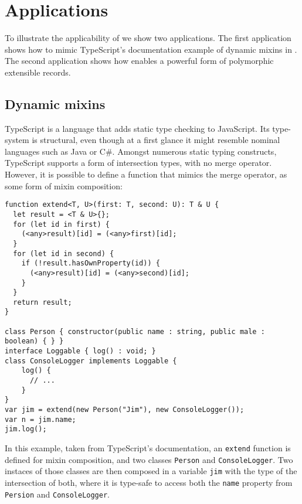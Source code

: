 \section{Applications}
\label{subsec:records}

To illustrate the applicability of \name we show two applications. The
first application shows how to mimic TypeScript's documentation example of 
dynamic mixins in \name. The second application shows how \name
enables a powerful form of polymorphic extensible records.

\subsection{Dynamic mixins}
TypeScript is a language that adds static type checking to JavaScript.
Its type-system is structural, even though at a first glance it might resemble 
nominal languages such as Java or C\#.
Amongst numerous static typing constructs, TypeScript supports a form of intersection types, 
with no merge operator. 
However, it is possible to define a function 
that mimics the merge operator, as some form of mixin composition:

\begin{lstlisting}
function extend<T, U>(first: T, second: U): T & U {
  let result = <T & U>{};
  for (let id in first) {
    (<any>result)[id] = (<any>first)[id];
  }
  for (let id in second) {
    if (!result.hasOwnProperty(id)) {
      (<any>result)[id] = (<any>second)[id];
    }
  }
  return result;
}

class Person { constructor(public name : string, public male : boolean) { } }
interface Loggable { log() : void; }
class ConsoleLogger implements Loggable {
    log() {
      // ...
    }
}
var jim = extend(new Person("Jim"), new ConsoleLogger());
var n = jim.name;
jim.log();
\end{lstlisting}

In this example, taken from TypeScript's documentation, an \lstinline$extend$ function is defined 
for mixin composition, and two classes \lstinline$Person$ and \lstinline$ConsoleLogger$. 
Two instaces of those classes are then composed in a variable \lstinline$jim$ with the type of 
the intersection of both, where it is type-safe to access both the \lstinline$name$ property
from \lstinline$Persion$ and \lstinline$ConsoleLogger$.

